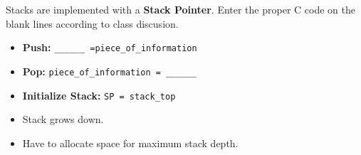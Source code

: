 Stacks are implemented with a {\bf Stack Pointer}.
 Enter the proper C code on the blank lines according	%
 to class discusion.	%

\begin{itemize}

 \item {\bf Push:} {\tt \_\_\_\_\_\_  =piece\_of\_information}	%

 \item {\bf Pop:}  {\tt piece\_of\_information = \_\_\_\_\_\_ }	%

        \item {\bf Initialize Stack:} {\tt SP = stack\_top}
        \item Stack grows down.
        \item Have to allocate space for maximum stack depth.
\end{itemize}



